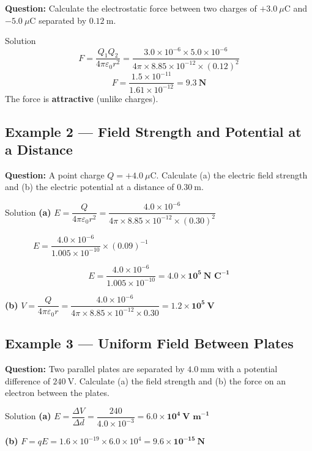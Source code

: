 \textbf{Question:} Calculate the electrostatic force between two charges of $+3.0\ \mu\text{C}$ and $-5.0\ \mu\text{C}$ separated by $0.12\ \text{m}$.

\begin{examplebox}{Solution}
$$F = \frac{Q_1 Q_2}{4\pi\varepsilon_0 r^2} = \frac{3.0\times10^{-6} \times 5.0\times10^{-6}}{4\pi \times 8.85\times10^{-12} \times (0.12)^2}$$
$$F = \frac{1.5\times10^{-11}}{1.61\times10^{-12}} = \mathbf{9.3\ \text{N}}$$
The force is \textbf{attractive} (unlike charges).
\end{examplebox}

\subsection*{Example 2 — Field Strength and Potential at a Distance}

\textbf{Question:} A point charge $Q = +4.0\ \mu\text{C}$. Calculate (a) the electric field strength and (b) the electric potential at a distance of $0.30\ \text{m}$.

\begin{examplebox}{Solution}
\textbf{(a)} \quad $E = \dfrac{Q}{4\pi\varepsilon_0 r^2} = \dfrac{4.0\times10^{-6}}{4\pi\times8.85\times10^{-12}\times(0.30)^2}$

$\phantom{(a)} \quad E = \dfrac{4.0\times10^{-6}}{1.005\times10^{-10}} \times (0.09)^{-1}$

$$E = \frac{4.0\times10^{-6}}{1.005\times10^{-10}} = \mathbf{4.0\times10^{5}\ \text{N C}^{-1}}$$

\vspace{0.3em}
\textbf{(b)} \quad $V = \dfrac{Q}{4\pi\varepsilon_0 r} = \dfrac{4.0\times10^{-6}}{4\pi\times8.85\times10^{-12}\times0.30} = \mathbf{1.2\times10^{5}\ \text{V}}$
\end{examplebox}

\subsection*{Example 3 — Uniform Field Between Plates}

\textbf{Question:} Two parallel plates are separated by $4.0\ \text{mm}$ with a potential difference of $240\ \text{V}$. Calculate (a) the field strength and (b) the force on an electron between the plates.

\begin{examplebox}{Solution}
\textbf{(a)} \quad $E = \dfrac{\Delta V}{\Delta d} = \dfrac{240}{4.0\times10^{-3}} = \mathbf{6.0\times10^{4}\ \text{V m}^{-1}}$

\vspace{0.3em}
\textbf{(b)} \quad $F = qE = 1.6\times10^{-19} \times 6.0\times10^4 = \mathbf{9.6\times10^{-15}\ \text{N}}$
\end{examplebox}

